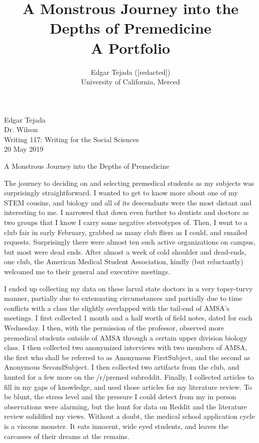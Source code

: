 \documentclass [12pt]{article}
\title{A Monstrous Journey into the Depths of Premedicine\\\medskip A Portfolio}
\author{Edgar Tejada ([redacted])\\University of California, Merced}
\begin{document}
\begin{flushleft}
Edgar Tejada\\
Dr. Wilson\\
Writing 117: Writing for the Social Sciences\\
20 May 2019\\


\begin{center}
	A Monstrous Journey into the Depths of Premedicine\\
\end{center}


\setlength{\parindent}{0.5in}
The journey to deciding on and selecting premedical students as my subjects was surprisingly straightforward. I wanted to get to know more about one of my STEM cousins, and biology and all of its descendants were the most distant and interesting to me. I narrowed that down even further to dentists and doctors as two groups that I know I carry some negative stereotypes of. Then, I went to a club fair in early February, grabbed as many club fliers as I could, and emailed requests. Surprisingly there were almost ten such active organizations on campus, but most were dead ends.
After almost a week of cold shoulder and dead-ends, one club, the American Medical Student Association, kindly (but reluctantly) welcomed me to their general and executive meetings.

I ended up collecting my data on these larval state doctors in a very topsy-turvy manner, partially due to extenuating circumstances and partially due to time conflicts with a class the slightly overlapped with the tail-end of AMSA's meetings. I first collected 1 month and a half worth of field notes, dated for each Wednesday. I then, with the permission of the professor, observed more premedical students outside of AMSA through a certain upper division biology class. I then collected two anonymized interviews with two members of AMSA, the first who shall be referred to as Anonymous FirstSubject, and the second as Anonymous SecondSubject. I then collected two artifacts from the club, and hunted for a few more on the /r/premed subreddit. Finally, I collected articles to fill in my gaps of knowledge, and used those articles for my literature review. To be blunt, the stress level and the pressure I could detect from my in person observations were alarming, but the hunt for data on Reddit and the literature review solidified my views. Without a doubt, the medical school application cycle is a viscous monster. It eats innocent, wide eyed students, and leaves the carcasses of their dreams at the remains.



\newpage
\medskip %
\nocite{*} %
\printbibliography%

\end{flushleft}
\end{document}
